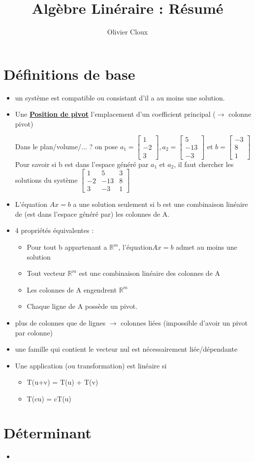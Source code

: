 \documentclass[12pt,a4paper]{article}
\author{Olivier Cloux}
\title{Algèbre Linéraire : Résumé}
\newcommand{\evid}[1]{\textbf{\underline{#1}}}
\newcommand{\R}{\ensuremath{\mathbb{R}} }
\begin{document}
\maketitle
\newpage
\tableofcontents
\newpage
\section{Définitions de base}
\begin{itemize}[label=$\sqrt{.}$]
	\item un système est compatible ou consistant d'il a au moins une solution.
	\item Une \evid{Position de pivot} l'emplacement d'un coefficient principal ($\to$ colonne pivot)
	\item[Dans le plan/volume/... ?] on pose $a_1 = 
	\begin{bmatrix}
	1\\
	-2\\
	3
	\end{bmatrix}, a_2 = \begin{bmatrix}
	5\\
	-13\\
	-3
	\end{bmatrix}$ et $b = \begin{bmatrix}
	-3\\
	8\\
	1
	\end{bmatrix}$ Pour savoir si b est dans l'espace généré par $a_1$ et $a_2$, il faut chercher les solutions du système $\begin{bmatrix}
	1 & 5 & 3\\
	-2 & -13 & 8\\
	3 & -3 & 1
	\end{bmatrix}$
	\item L'équation $Ax = b$ a une solution seulement si b est une combinaison linéaire de (est dans l'espace généré par) les colonnes de A.
	\item 4 propriétés équivalentes :
		\begin{itemize}
			\item Pour tout b appartenant a $\R^m$, l'équation$Ax= b$ admet au moins une solution
			\item Tout vecteur $\R^m$ est une combinaison linéaire des colonnes de A
			\item Les colonnes de A engendrent $\R^m$
			\item Chaque ligne de A possède un pivot.
		\end{itemize}
	\item plus de colonnes que de lignes $\to$ colonnes liées (impossible d'avoir un pivot par colonne)
	\item une famille qui contient le vecteur nul est nécessairement liée/dépendante
	\item Une application (ou transformation) est linéaire si
		\begin{itemize}
			\item T(u+v) = T(u) + T(v)
			\item T(cu) = cT(u)
		\end{itemize}
\end{itemize}
\section{Déterminant}
\begin{itemize}
\item 
\end{itemize}
\end{document}
